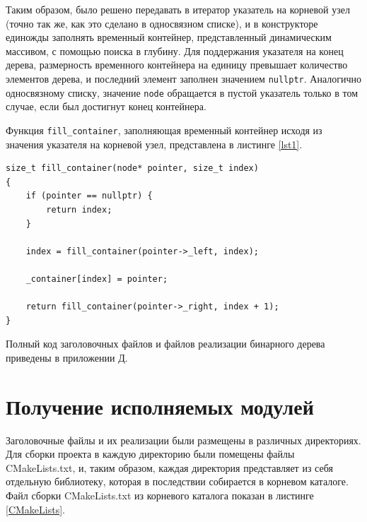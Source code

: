 \documentclass[a4paper,12pt]{article}
\begin{document}
Таким образом, было решено передавать в итератор указатель на корневой узел (точно так же, как это сделано в односвязном списке), и в конструкторе единожды заполнять временный контейнер, представленный динамическим массивом, с помощью поиска в глубину.
Для поддержания указателя на конец дерева, размерность временного контейнера на единицу превышает количество элементов дерева, и последний элемент заполнен значением \verb!nullptr!.
Аналогично односвязному списку, значение \verb!node! обращается в пустой указатель только в том случае, если был достигнут конец контейнера.

Функция \verb!fill_container!, заполняющая временный контейнер исходя из значения указателя на корневой узел, представлена в листинге \ref{lst1}.

\begin{lstlisting}[caption={Функция для заполнения временного контейнера},label=lst1]
size_t fill_container(node* pointer, size_t index)
{
	if (pointer == nullptr) {
		return index;
	}
	
	index = fill_container(pointer->_left, index);
	
	_container[index] = pointer;
	
	return fill_container(pointer->_right, index + 1);
}
\end{lstlisting}

Полный код заголовочных файлов и файлов реализации бинарного дерева приведены в приложении Д.

\cleardoublepage

\section{Получение исполняемых модулей}

Заголовочные файлы и их реализации были размещены в различных директориях.
Для сборки проекта в каждую директорию были помещены файлы CMakeLists.txt, и, таким образом, каждая директория представляет из себя отдельную библиотеку, которая в последствии собирается в корневом каталоге.
Файл сборки CMakeLists.txt из корневого каталога показан в листинге \ref{CMakeLists}.
\end{document}
